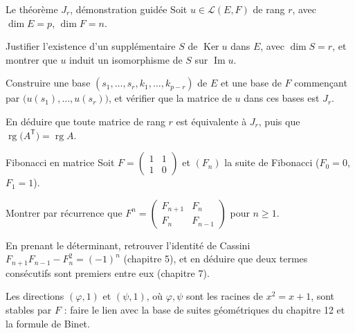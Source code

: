 \begin{exercice}[3]{Le théorème $J_r$, démonstration guidée}
Soit $u\in\mathcal{L}(E,F)$ de rang $r$, avec $\dim E=p$, $\dim F=n$.
\begin{questions}
  \item Justifier l'existence d'un supplémentaire $S$ de
    $\operatorname{Ker}u$ dans $E$, avec $\dim S=r$, et montrer que $u$
    induit un isomorphisme de $S$ sur $\operatorname{Im}u$.
  \item Construire une base $(s_1,\dots,s_r,k_1,\dots,k_{p-r})$ de $E$ et
    une base de $F$ commençant par $\bigl(u(s_1),\dots,u(s_r)\bigr)$, et
    vérifier que la matrice de $u$ dans ces bases est $J_r$.
  \item En déduire que toute matrice de rang $r$ est équivalente à $J_r$,
    puis que $\operatorname{rg}\bigl(A^{\mathsf T}\bigr)=\operatorname{rg}A$.
\end{questions}
\end{exercice}

\begin{exercice}[3]{Fibonacci en matrice}
Soit $F=\begin{pmatrix}1&1\\1&0\end{pmatrix}$ et $(F_n)$ la suite de
Fibonacci ($F_0=0$, $F_1=1$).
\begin{questions}
  \item Montrer par récurrence que
    $F^{n}=\begin{pmatrix}F_{n+1}&F_n\\F_n&F_{n-1}\end{pmatrix}$ pour
    $n\geqslant1$.
  \item En prenant le déterminant, retrouver l'identité de Cassini
    $F_{n+1}F_{n-1}-F_n^{2}=(-1)^{n}$ (chapitre 5), et en déduire que deux
    termes consécutifs sont premiers entre eux (chapitre 7).
  \item Les directions $(\varphi,1)$ et $(\psi,1)$, où $\varphi,\psi$ sont
    les racines de $x^{2}=x+1$, sont stables par $F$ : faire le lien avec
    la base de suites géométriques du chapitre 12 et la formule de Binet.
\end{questions}
\end{exercice}


